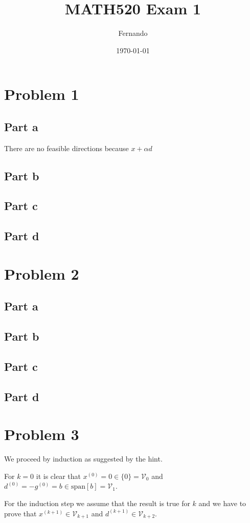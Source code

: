 \documentclass{article}
\begin{document}
\title{MATH520 Exam 1}
\author{Fernando}
\date{\today}
\maketitle

\section*{Problem 1}
\subsection*{Part a}
There are no feasible directions because $x+\alpha d$
\subsection*{Part b}
\subsection*{Part c}
\subsection*{Part d}
\section*{Problem 2}
\subsection*{Part a}
\subsection*{Part b}
\subsection*{Part c}
\subsection*{Part d}
\section*{Problem 3}
We proceed by induction as suggested by the hint.

For $k=0$ it is clear that $x^{(0)}=0\in\{0\}=\mathcal{V}_0$ and
$d^{(0)}=-g^{(0)}=b\in \text{span}[b]=\mathcal{V}_1$.

For the induction step we assume that the result is true for $k$ and we have to
prove that $x^{(k+1)}\in \mathcal{V}_{k+1}$ and $d^{(k+1)}\in
\mathcal{V}_{k+2}$.
\end{document}

